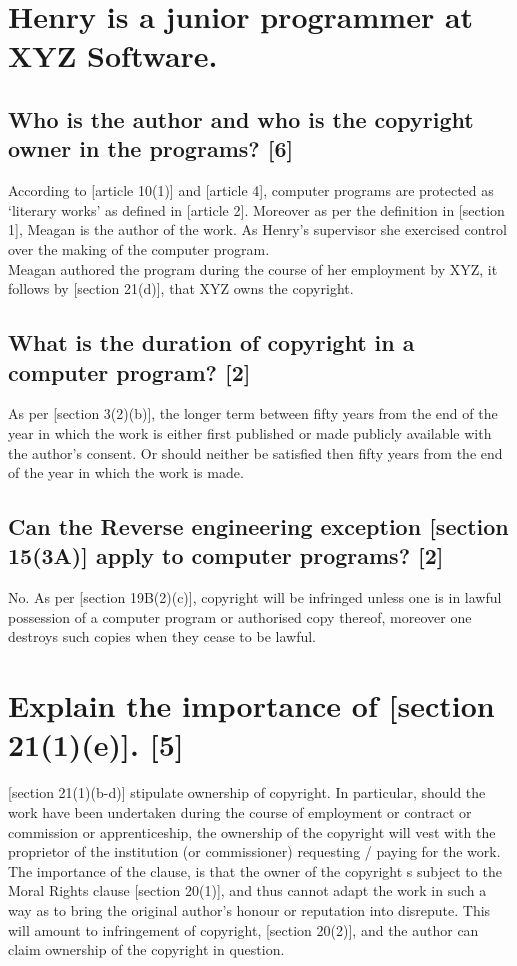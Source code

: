 \documentclass[11pt]{article}
\begin{document}
\section{Henry is a junior programmer at XYZ Software.}
\label{sec:org025a809}
\subsection{Who is the author and who is the copyright owner in the programs? [6]}
\label{sec:orga0003a7}
According to [article 10(1)]\cite{wto17_trips} and [article
4]\cite{wipo96_copyright_treaty}, computer programs are protected as `literary
works' as defined in [article 2]\cite{wipo86_berne}. Moreover as per the
definition in [section 1]\cite{rsa78_copyrightact}, Meagan is the author of the
work. As Henry's supervisor she exercised control over the making of the
computer program.\\

Meagan authored the program during the course of her employment by XYZ, it
follows by [section 21(d)]\cite{rsa78_copyrightact}, that XYZ owns the copyright.
\subsection{What is the duration of copyright in a computer program? [2]}
\label{sec:org84556b4}
As per [section 3(2)(b)]\cite{rsa78_copyrightact}, the longer term between fifty
years from the end of the year in which the work is either first published or
made publicly available with the author's consent. Or should neither be
satisfied then fifty years from the end of the year in which the work is made.
\subsection{Can the Reverse engineering exception [section 15(3A)]\cite{rsa78_copyrightact} apply to computer programs? [2]}
\label{sec:orge6b012c}
No. As per [section 19B(2)(c)]\cite{rsa78_copyrightact}, copyright will be
infringed unless one is in lawful possession of a computer program or
authorised copy thereof, moreover one destroys such copies when they cease to
be lawful.
\section{Explain the importance of [section 21(1)(e)]\cite{rsa78_copyrightact}. [5]}
\label{sec:orgedc7bd8}
[section 21(1)(b-d)]\cite{rsa78_copyrightact} stipulate ownership of
copyright. In particular, should the work have been undertaken during the
course of employment or contract or commission or apprenticeship, the ownership
of the copyright will vest with the proprietor of the institution (or commissioner)
requesting / paying for the work. The importance of the clause, is that the
owner of the copyright s subject to the Moral Rights clause [section
20(1)]\cite{rsa78_copyrightact}, and thus cannot adapt the work in such a way as
to bring the original author's honour or reputation into disrepute. This will
amount to infringement of copyright, [section 20(2)]\cite{rsa78_copyrightact},
and the author can claim ownership of the copyright in question.
\end{document}
